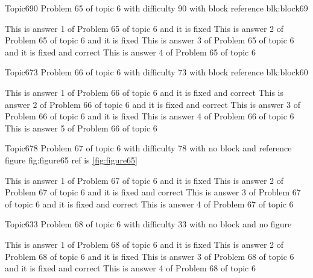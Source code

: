\documentclass[master]{exam}
\begin{document}
\begin{problem}[requires=blk:block69]{Topic6}{90}
	Problem 65 of topic 6 with difficulty 90 with block reference blk:block69
	\begin{answers}
		\answer[fixed] This is answer 1 of Problem 65 of topic 6 and it is fixed
		\answer[fixed] This is answer 2 of Problem 65 of topic 6 and it is fixed
		 This is answer 3 of Problem 65 of topic 6 and it is fixed and correct
		\answer This is answer 4 of Problem 65 of topic 6 
	\end{answers}
\end{problem}

\begin{problem}[requires=blk:block60]{Topic6}{73}
	Problem 66 of topic 6 with difficulty 73 with block reference blk:block60
	\begin{answers}
		 This is answer 1 of Problem 66 of topic 6 and it is fixed and correct
		 This is answer 2 of Problem 66 of topic 6 and it is fixed and correct
		\answer[fixed] This is answer 3 of Problem 66 of topic 6 and it is fixed
		\answer This is answer 4 of Problem 66 of topic 6 
		\answer This is answer 5 of Problem 66 of topic 6 
	\end{answers}
\end{problem}

\begin{problem}{Topic6}{78}
	Problem 67 of topic 6 with difficulty 78 with no block and reference figure fig:figure65 ref is \ref{fig:figure65}
	\begin{answers}
		\answer[fixed] This is answer 1 of Problem 67 of topic 6 and it is fixed
		 This is answer 2 of Problem 67 of topic 6 and it is fixed and correct
		 This is answer 3 of Problem 67 of topic 6 and it is fixed and correct
		\answer This is answer 4 of Problem 67 of topic 6 
	\end{answers}
\end{problem}

\begin{problem}{Topic6}{33}
	Problem 68 of topic 6 with difficulty 33 with no block and no figure
	\begin{answers}
		\answer[fixed] This is answer 1 of Problem 68 of topic 6 and it is fixed
		\answer[fixed] This is answer 2 of Problem 68 of topic 6 and it is fixed
		 This is answer 3 of Problem 68 of topic 6 and it is fixed and correct
		\answer This is answer 4 of Problem 68 of topic 6 
	\end{answers}
\end{problem}
\end{document}
